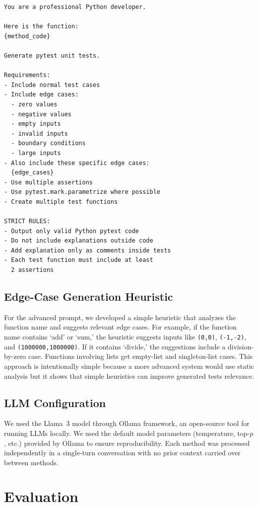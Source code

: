 \documentclass[conference]{IEEEtran}
\begin{document}
\begin{lstlisting}
You are a professional Python developer.

Here is the function:
{method_code}

Generate pytest unit tests.

Requirements:
- Include normal test cases
- Include edge cases:
  - zero values
  - negative values
  - empty inputs
  - invalid inputs
  - boundary conditions
  - large inputs
- Also include these specific edge cases:
  {edge_cases}
- Use multiple assertions
- Use pytest.mark.parametrize where possible
- Create multiple test functions

STRICT RULES:
- Output only valid Python pytest code
- Do not include explanations outside code
- Add explanation only as comments inside tests
- Each test function must include at least
  2 assertions
\end{lstlisting}

\subsection{Edge-Case Generation Heuristic}

For the advanced prompt, we developed a simple heuristic that analyzes the function name and suggests relevant edge cases. For example, if the function name contains `add' or `sum,' the heuristic suggests inputs like \texttt{(0,0)}, \texttt{(-1,-2)}, and \texttt{(1000000,1000000)}. If it contains `divide,' the suggestions include a division-by-zero case. Functions involving lists get empty-list and singleton-list cases. This approach is intentionally simple because a more advanced system would use static analysis but it shows that simple heuristics can improve generated tests relevance. 

\subsection{LLM Configuration}

We used the Llama~3 model through Ollama framework, an open-source tool for running LLMs locally. We used the default model parameters (temperature, top-$p$, etc.) provided by Ollama to ensure reproducibility. Each method was processed independently in a single-turn conversation with no prior context carried over between methods.

\section{Evaluation}
\end{document}
